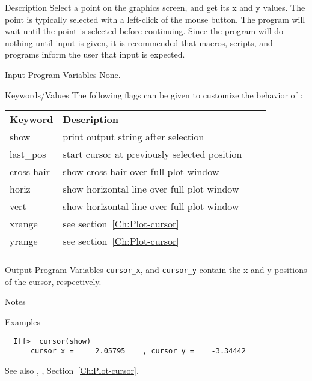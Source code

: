 
\begin{IFFcom}
\item[Description] Select a point on the graphics screen, and get its x
  and y values.  The point is typically selected with a left-click of the
  mouse button.  The program will wait until the point is selected
  before continuing.   Since the program will do nothing until input is
  given, it is recommended that macros, scripts,  and programs inform the
  user that input is expected.  
\item[Input Program Variables] None.
\item[Keywords/Values] 
The following flags can be given to customize the behavior of
{}:

{\relax \hspace{0.25truein}\par\noindent\relax}
\begin{tabular}{llrl}
  \textbf{Keyword} &  \textbf{Description}\\
  \noalign{\smallskip}
  {show}       & print output string after selection\\
  {last\_pos}  & start cursor at previously selected position\\
  {cross-hair} & show cross-hair over full plot window\\
  {horiz}      & show horizontal line over full plot window\\
  {vert}       & show horizontal line over full plot window\\
  {xrange}     & see section~\ref{Ch:Plot-cursor}\\
  {yrange}     & see section~\ref{Ch:Plot-cursor}\\
  \noalign{\smallskip}
\end{tabular}
\noindent

\item[Output Program Variables] {\texttt{cursor\_x}}, and
  {\texttt{cursor\_y}} contain the x and y positions of the cursor,
  respectively.
\item[Notes]  
\item[Examples] {\hspace{1.in} \vspace{-0.1truein} \relax }
\begin{verbatim} 
  Iff>  cursor(show)
      cursor_x =     2.05795    , cursor_y =    -3.34442
\end{verbatim}
\item[See also] {}, {}, 
Section~\ref{Ch:Plot-cursor}.
\end{IFFcom}

